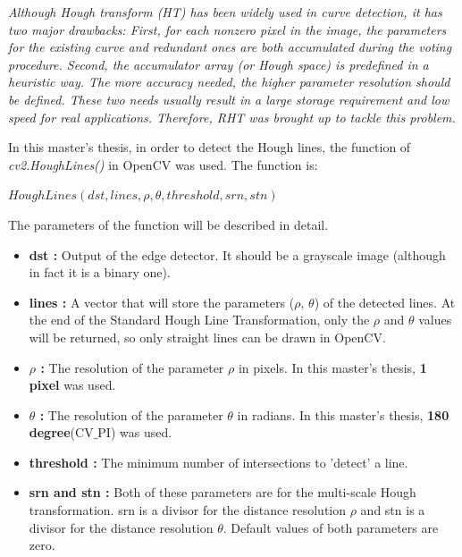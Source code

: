 \emph{\color{red}Although Hough transform (HT) has been widely used in curve detection, it has two major drawbacks: First, for each nonzero pixel in the image, the parameters for the existing curve and redundant ones are both accumulated during the voting procedure. Second, the accumulator array (or Hough space) is predefined in a heuristic way. The more accuracy needed, the higher parameter resolution should be defined. These two needs usually result in a large storage requirement and low speed for real applications. Therefore, RHT was brought up to tackle this problem.}

In this master's thesis, in order to detect the Hough lines, the function of \textit{cv2.HoughLines()} in OpenCV was used. The function is:

  \begin{center}
  
$HoughLines(dst, lines, \rho, \theta, threshold, srn, stn )  $

  \end{center}

The parameters of the function will be described in detail.\cite{Standard_Hough_Transformation2}
 
\begin{itemize}

\item \textbf{dst : }Output of the edge detector. It should be a grayscale image (although in fact it is a binary one).
 
\item \textbf{lines : }A vector that will store the parameters ($ \rho $, $ \theta $) of the detected lines. At the end of the Standard Hough Line Transformation, only the $ \rho $ and $ \theta $ values will be returned, so only straight lines can be drawn in OpenCV.

\item \textbf{$ \rho $ : }The resolution of the parameter $ \rho $ in pixels. In this master's thesis, \textbf{1 pixel} was used.

\item \textbf{$ \theta $ : }The resolution of the parameter $ \theta $ in radians. In this master's thesis, \textbf{180 degree}(CV$ \_ $PI) was used.

\item \textbf{threshold : }The minimum number of intersections to 'detect' a line.

\item \textbf{srn and stn : }Both of these parameters are for the multi-scale Hough transformation. srn is a divisor for the distance resolution $ \rho $ and stn is a divisor for the distance resolution $ \theta $. Default values of both parameters are zero.

\end{itemize}

